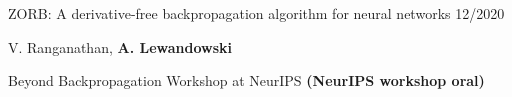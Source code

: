 \begin{cventries}
    \pubentry
    {ZORB: A derivative-free backpropagation algorithm for neural networks}
    {12/2020}
    {
      \vspace{-4.0mm}
      \begin{cvitems}
        \item[>>] V. Ranganathan, \textbf{A. Lewandowski}
    	\item[>>] Beyond Backpropagation Workshop at NeurIPS \textbf{(NeurIPS workshop oral)}
      \end{cvitems}
    }








\end{cventries}
